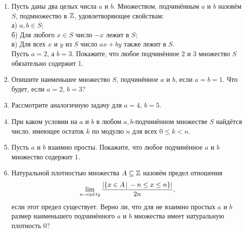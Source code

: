 \begin{enumerate}
\item Пусть даны два целых числа $a$ и $b$. Множеством, подчинённым $a$ и $b$ назовём $S$, подмножество в $\mathbb{Z}$, удовлетворяющее свойствам:\\
а) $a,b\in S$;\\
б) Для любого $x\in S$ число $-x$ лежит в $S$;\\
в) Для всех $x$ и $y$ из $S$ число $ax+by$ также лежит в $S$.\\
Пусть $a=2$, а $b=3$. Покажите, что любое подчинённое $2$ и $3$ множество $S$ обязательно содержит 1.
\item Опишите наименьшее множество $S$, подчинённое $a$ и $b$, если $a=b=1$. Что будет, если $a=2$, $b=3$?
\item Рассмотрите аналогичную задачу для $a=4$, $b=5$.
\item При каком условии на $a$ и $b$ в любом $a,b$-подчинённом множестве $S$ найдётся число, имеющее остаток $k$ по модулю $n$ для всех $0 \leq k<n$.
\item Пусть $a$ и $b$ взаимно просты. Покажите, что любое подчинённое $a$ и $b$ множество содержит 1.
\item Натуральной плотностью множества $A\subseteq \mathbb{Z}$ назовём предел отношения 
$$ \lim_{n\to \text{inf\,}ty}\frac{|\{x\in A\,|\, -n\leq x\leq n\}|}{2n},$$ 
если этот предел существует. Верно ли, что для не взаимно простых $a$ и $b$ размер наименьшего подчинённого $a$ и $b$ множества имеет натуральную плотность 0?
\end{enumerate}


